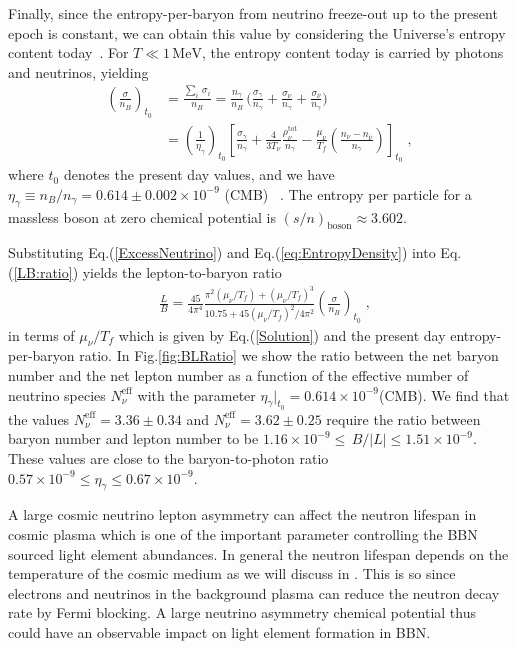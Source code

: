 Finally, since the entropy-per-baryon from neutrino freeze-out up to the present epoch is constant, we can obtain this value by considering the Universe's entropy content today~\cite{Fromerth:2012fe}. For $T\ll1\,\mathrm{MeV}$, the entropy content today is carried by photons and neutrinos, yielding
\begin{align}
\label{NbS}
\left(\frac{\sigma}{n_B}\right)_{t_0}&=\frac{\sum_i\,\sigma_i}{n_B}=\frac{n_\gamma}{n_B}\,\bigg(\frac{\sigma_\gamma}{n_\gamma}+\frac{\sigma_\nu}{n_\gamma}+\frac{\sigma_{\bar{\nu}}}{n_\gamma}\bigg)\;\\
&=\left(\frac{1}{\eta_\gamma}\right)_{\!\!t_0}\!\!\left[\frac{\sigma_\gamma}{n_\gamma}+\frac{4}{3T_\nu}\frac{\rho_\nu^{\mathrm{tot}}}{n_\gamma}-\frac{\mu_\nu}{T_f}\left(\frac{n_\nu-n_{\bar{\nu}}}{n_\gamma}\right)\right]_{t_0}\;,
\end{align}
where $t_0$ denotes the present day values, and we have $\eta_\gamma\equiv n_B/n_\gamma= 0.614\pm0.002\times10^{-9}$ 
(CMB)~\cite{ParticleDataGroup:2022pth} . The entropy per particle for a massless boson at zero chemical potential is $(s/n)_{\mathrm{boson}}\approx 3.602$.

Substituting Eq.\;(\ref{ExcessNeutrino}) and Eq.\;(\ref{eq:EntropyDensity}) into Eq.\;(\ref{LB:ratio}) yields the lepton-to-baryon ratio
\begin{align}\label{LBratioFinal}
&\frac{L}{B}=\frac{45}{4\pi^4}\frac{\pi^2(\mu_\nu/T_f)+(\mu_\nu/T_f)^3}{10.75+{45}(\mu_\nu/T_f)^2/{4\pi^2}}\left(\frac{\sigma}{n_B}\right)_{\!\!t_0}\;,
\end{align}
in terms of $\mu_\nu/T_f$ which is given by Eq.(\ref{Solution}) and the present day entropy-per-baryon ratio. In Fig.\;\ref{fig:BLRatio} we show the ratio between the net baryon number and the net lepton number as a function of the effective number of neutrino species $N^{\mathrm{eff}}_\nu$ with the parameter $ \eta_\gamma|_{t_0} =0.614\times 10^{-9}$(CMB). We find that the values $N_\nu^{\mathrm{eff}}=3.36\pm0.34$ and $N_\nu^{\mathrm{eff}}= 3.62\pm0.25$ require the ratio between baryon number and lepton number to be $1.16 \times 10^{-9} \leqslant\, B/|L| \leqslant 1.51\times 10^{-9}$. These values are close to the baryon-to-photon ratio $0.57 \times 10^{-9} \leqslant \eta_\gamma \leqslant 0.67\times 10^{-9}$. 


A large cosmic neutrino lepton asymmetry can affect the neutron lifespan in cosmic plasma which is one of the important parameter controlling the BBN sourced light element abundances. 
In general the neutron lifespan depends on the temperature of the cosmic medium as we will discuss in . This is so since electrons and neutrinos in the background plasma can reduce the neutron decay rate by Fermi blocking. A large neutrino asymmetry chemical potential thus could have an observable impact on light element formation in BBN.

